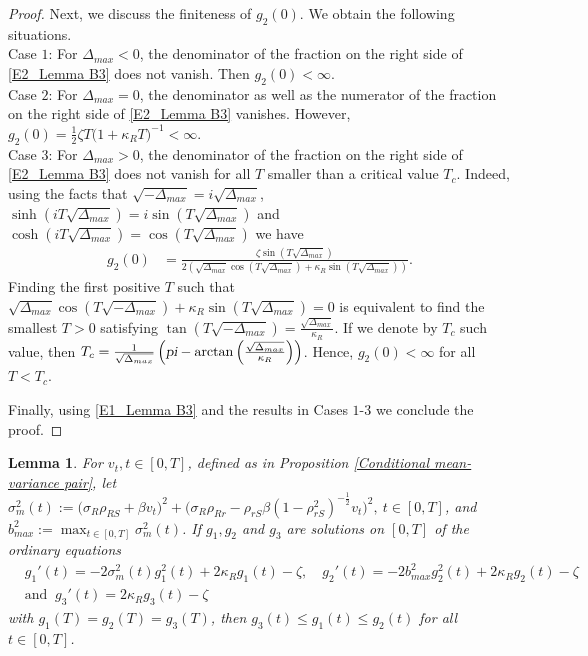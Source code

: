 \documentclass[12,reqno]{amsart}
\numberwithin{equation}{section}
\newtheorem{lemm}[defi]{Lemma}
\begin{document}
\begin{proof}
	Next, we discuss the finiteness of $g_{2}(0)$. We obtain the following situations.\\
	Case $1$: For $\Delta_{max}<0$, the denominator of the fraction on the right side of \eqref{E2_Lemma B3} does not vanish. Then $g_{2}(0)<\infty$.\\
	Case $2$: For $\Delta_{max}=0$, the denominator as well as the numerator of the fraction on the right side of \eqref{E2_Lemma B3} vanishes. However, $g_{2}(0)=\frac{1}{2}\zeta T\big(1+\kappa_{R}T\big)^{-1}<\infty$.\\
	Case $3$: For $\Delta_{max}>0$, the denominator of the fraction on the right side of \eqref{E2_Lemma B3} does not vanish for all $T$ smaller than a critical value $T_{c}$. Indeed, using the facts that $\sqrt{-\Delta_{max}}=i\sqrt{\Delta_{max}}$, $\sinh(iT\sqrt{\Delta_{max}})=i\sin(T\sqrt{\Delta_{max}})$ and $\cosh(iT\sqrt{\Delta_{max}})=\cos(T\sqrt{\Delta_{max}})$ we have
	\begin{align}\label{E3_Lemma B3}
		g_{2}(0)&=\frac{\zeta\sin(T\sqrt{\Delta_{max}})}{2\left(\sqrt{\Delta_{max}}\cos(T\sqrt{\Delta_{max}})+\kappa_{R}\sin(T\sqrt{\Delta_{max}})\right)}.
	\end{align}
	Finding the first positive $T$ such that $\sqrt{\Delta_{max}}\cos(T\sqrt{-\Delta_{max}})+\kappa_{R}\sin(T\sqrt{\Delta_{max}})=0$ is equivalent to find the smallest $T>0$ satisfying $\tan(T\sqrt{-\Delta_{max}})=\frac{\sqrt{\Delta_{max}}}{\kappa_{R}}$. If we denote by $T_{c}$ such value, then $T_{c}=\frac{1}{\sqrt{\Delta_{max}}}\left( \textsl{pi}-\arctan\left(\frac{\sqrt{\Delta_{max}}}{\kappa_{R}}\right) \right)$. Hence, $g_{2}(0)<\infty$ for all $T<T_{c}$.
	
	Finally, using \eqref{E1_Lemma B3}  and the results in Cases $1$-$3$ we conclude the proof.
\end{proof}
\begin{lemm}\label{Comparison theorem for Ricatti equations}
	For $v_{t},t\in[0,T]$, defined as in Proposition \ref{Conditional mean-variance pair}, let $\sigma_{m}^{2}(t):=\big(\sigma_{R}\rho_{RS}+\beta v_{t}\big)^{2}+\big(\sigma_{R}\rho_{Rr} -\rho_{rS}\beta(1-\rho_{rS}^{2})^{-\frac{1}{2}}v_{t}\big)^{2},~t\in[0,T]$, and $b_{max}^{2}:=\max_{t\in[0,T]}\sigma_{m}^{2}(t)$. If $g_{1},g_{2}$ and $g_{3}$ are solutions on $[0,T]$ of the ordinary equations
	\begin{align*}
		&g_{1}'(t)=-2\sigma_{m}^{2}(t)g_{1}^{2}(t)+2\kappa_{R}g_{1}(t)-\zeta,\quad g_{2}'(t)=-2b_{max}^{2}g_{2}^{2}(t)+2\kappa_{R}g_{2}(t)-\zeta\\
		&\text{and }~g_{3}'(t)=2\kappa_{R}g_{3}(t)-\zeta
	\end{align*}
	with $g_{1}(T)=g_{2}(T)=g_{3}(T)$, then $g_{3}(t)\le g_{1}(t)\le g_{2}(t)$ for all $t\in[0,T]$.
\end{lemm}
\end{document}
